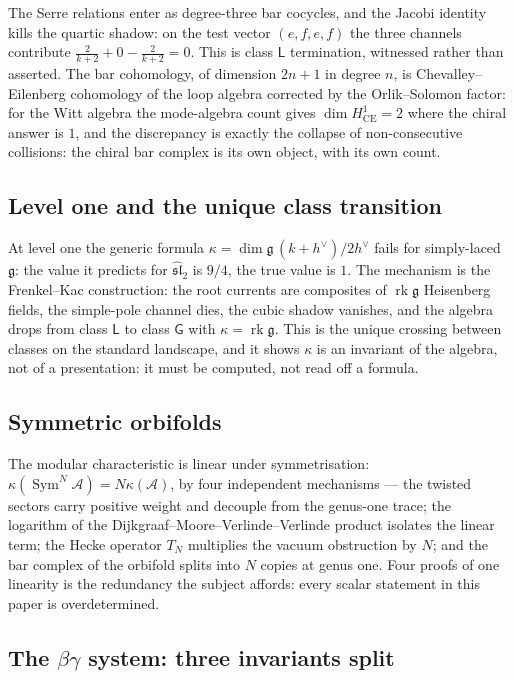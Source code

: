 \documentclass[11pt]{amsart}
\numberwithin{equation}{section}
\theoremstyle{plain}
\theoremstyle{definition}
\theoremstyle{remark}
\newcommand{\cA}{\mathcal{A}}
\newcommand{\fg}{\mathfrak{g}}
\newcommand{\dvee}{h^{\vee}}
\begin{document}
The Serre relations enter as degree-three bar cocycles, and the Jacobi
identity kills the quartic shadow: on the test vector
$(e,f,e,f)$ the three channels contribute
$\tfrac{2}{k+2}+0-\tfrac{2}{k+2}=0$. This is class $\mathsf{L}$
termination, witnessed rather than asserted. The bar cohomology, of
dimension $2n+1$ in degree $n$, is Chevalley--Eilenberg cohomology of
the loop algebra corrected by the Orlik--Solomon factor: for the Witt
algebra the mode-algebra count gives $\dim H^{1}_{\mathrm{CE}}=2$ where
the chiral answer is $1$, and the discrepancy is exactly the collapse of
non-consecutive collisions: the chiral bar complex is its own
object, with its own count.

\subsection{Level one and the unique class transition}

At level one the generic formula
$\kappa=\dim\fg\,(k+\dvee)/2\dvee$ fails for simply-laced $\fg$: the
value it predicts for $\widehat{\mathfrak{sl}}_2$ is $9/4$, the true
value is $1$. The mechanism is the Frenkel--Kac construction: the root
currents are composites of $\operatorname{rk}\fg$ Heisenberg fields, the
simple-pole channel dies, the cubic shadow vanishes, and the algebra
drops from class $\mathsf{L}$ to class $\mathsf{G}$ with
$\kappa=\operatorname{rk}\fg$. This is the unique crossing between
classes on the standard landscape, and it shows $\kappa$ is an invariant
of the algebra, not of a presentation: it must be computed, not read off
a formula.

\subsection{Symmetric orbifolds}

The modular characteristic is linear under symmetrisation:
$\kappa(\operatorname{Sym}^{N}\cA)=N\kappa(\cA)$, by four independent
mechanisms --- the twisted sectors carry positive weight and decouple
from the genus-one trace; the logarithm of the
Dijkgraaf--Moore--Verlinde--Verlinde product isolates the linear term;
the Hecke operator $T_N$ multiplies the vacuum obstruction by $N$;
and the bar complex of the orbifold splits into $N$ copies at genus
one. Four proofs of one linearity is the redundancy the subject
affords: every scalar statement in this paper is overdetermined.

\subsection{The $\beta\gamma$ system: three invariants split}
\end{document}
